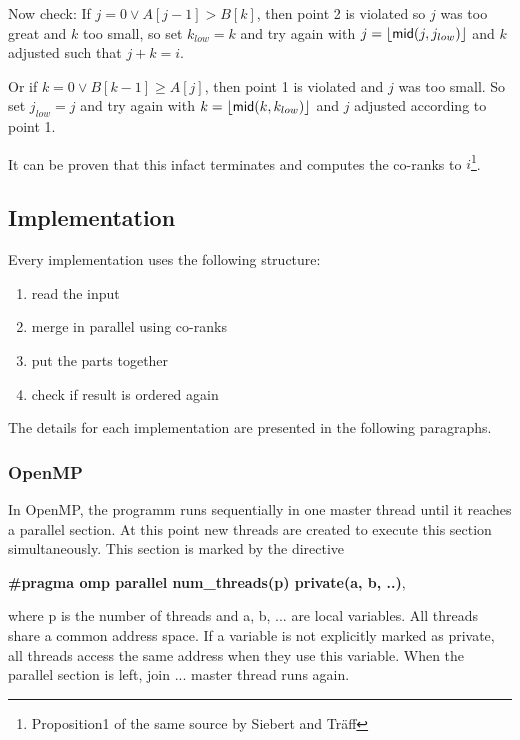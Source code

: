 Now check:
If $j=0 \vee A[j-1] > B[k]$, then point 2 is violated so $j$ was too great and $k$ too small,
so set $k_{low}=k$ and try again with $j = \floor*{\middlee(j,j_{low})}$ and $k$ adjusted such that $j + k = i$.

Or if $k=0 \vee B[k-1] \geq A[j]$, then point 1 is violated and $j$ was too small.
So set $j_{low}=j$ and try again with $k = \floor*{\middlee(k,k_{low})}$ and $j$ adjusted according to point 1.

It can be proven that this infact terminates and computes the co-ranks to $i$\footnote{Proposition1 of the same source by Siebert and Träff}.

%


\subsection{Implementation}
Every implementation uses the following structure:
\begin{enumerate}
  \item read the input
  \item merge in parallel using co-ranks
  \item put the parts together
  \item check if result is ordered again
\end{enumerate}
The details for each implementation are presented in the following paragraphs.

\subsubsection{OpenMP}
In OpenMP, the programm runs sequentially in one master thread until it reaches a parallel section.
At this point new threads are created to execute this section simultaneously.
This section is marked by the directive

\textbf{\#pragma omp parallel num\_threads(p) private(a, b, ..)},

where p is the number of threads and a, b, ... are local variables.
All threads share a common address space.
If a variable is not explicitly marked as private, all threads access the same address when they use this variable.
When the parallel section is left, join ... master thread runs again.

